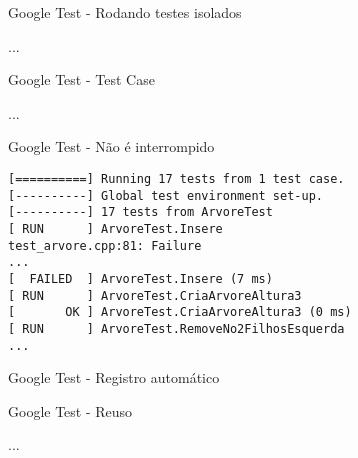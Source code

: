\documentclass[10pt,a4paper]{beamer}
\begin{document}
	\begin{frame}{Google Test - Rodando testes isolados}
			\begin{block}{}
					
					...
					
			\end{block}
	\end{frame}

	\begin{frame}{Google Test - Test Case}
			\begin{block}{}
					
					...
					
			\end{block}
	\end{frame}

	\begin{frame}[fragile]{Google Test - Não é interrompido}
		\begin{verbatim}
[==========] Running 17 tests from 1 test case.
[----------] Global test environment set-up.
[----------] 17 tests from ArvoreTest
[ RUN      ] ArvoreTest.Insere
test_arvore.cpp:81: Failure
...
[  FAILED  ] ArvoreTest.Insere (7 ms)
[ RUN      ] ArvoreTest.CriaArvoreAltura3
[       OK ] ArvoreTest.CriaArvoreAltura3 (0 ms)
[ RUN      ] ArvoreTest.RemoveNo2FilhosEsquerda
...
		\end{verbatim}
	\end{frame}

	\begin{frame}{Google Test - Registro automático}
			\begin{block}{}
					
			\end{block}
	\end{frame}

	\begin{frame}{Google Test - Reuso}
			\begin{block}{}
					
					...
					
			\end{block}
	\end{frame}
\end{document}
